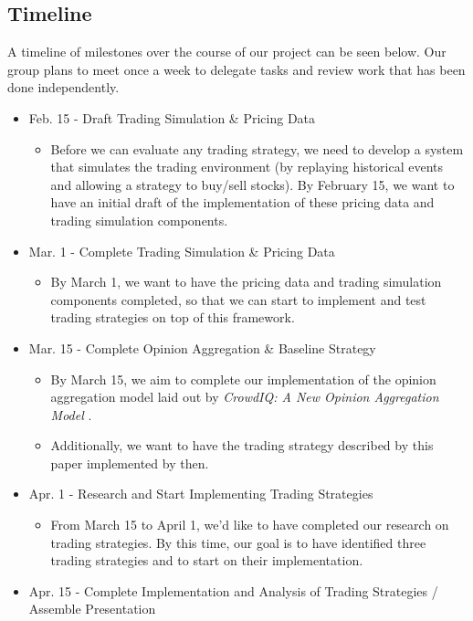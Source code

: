 \subsection{Timeline}

A timeline of milestones over the course of our project can be seen below.
Our group plans to meet once a week to delegate tasks and review work that has been done independently.

\begin{itemize}
\item Feb. 15 - Draft Trading Simulation \& Pricing Data
  \begin{itemize}
  \item Before we can evaluate any trading strategy, we need to develop a system that simulates the trading environment (by replaying historical events and allowing a strategy to buy/sell stocks).
    By February 15, we want to have an initial draft of the implementation of these pricing data and trading simulation components.
  \end{itemize}
\item Mar. 1 - Complete Trading Simulation \& Pricing Data
  \begin{itemize}
  \item By March 1, we want to have the pricing data and trading simulation components completed, so that we can start to implement and test trading strategies on top of this framework.
  \end{itemize}
\item Mar. 15 - Complete Opinion Aggregation \& Baseline Strategy
  \begin{itemize}
  \item By March 15, we aim to complete our implementation of the opinion aggregation model laid out by \textit{CrowdIQ: A New Opinion Aggregation Model} \cite{crowdiq}.
  \item Additionally, we want to have the trading strategy described by this paper implemented by then.
  \end{itemize}
\item Apr. 1 - Research and Start Implementing Trading Strategies
  \begin{itemize}
  \item From March 15 to April 1, we'd like to have completed our research on trading strategies.
    By this time, our goal is to have identified three trading strategies and to start on their implementation.
  \end{itemize}
\item Apr. 15 - Complete Implementation and Analysis of Trading Strategies / Assemble Presentation

\end{itemize}
